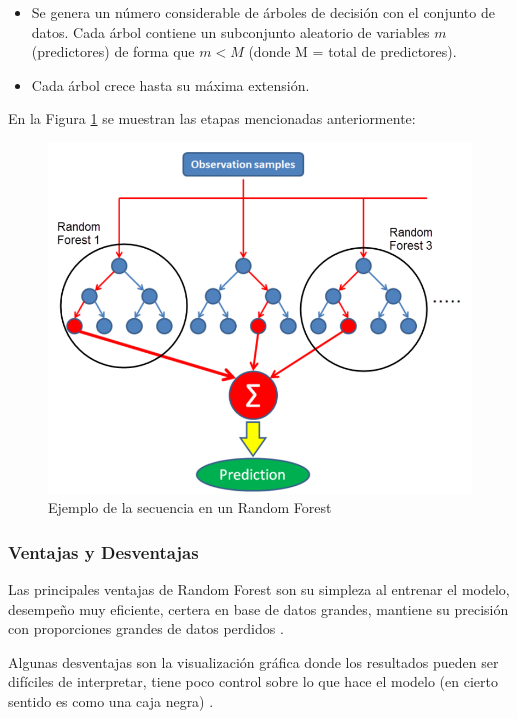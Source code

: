 \begin{itemize}
	\item[1-.] Se genera un número considerable de árboles de decisión con el conjunto de datos. Cada árbol contiene un subconjunto aleatorio de variables $m$ (predictores) de forma que $m < M$ (donde M = total de predictores).
	\item[2-.] Cada árbol crece hasta su máxima extensión.
\end{itemize}

\par En la Figura \ref{fig:Random Forest} se muestran las etapas mencionadas anteriormente:

\begin{center}
	\begin{figure}[H]
		\centering
		\includegraphics[scale=0.5]{img/Marco Teorico/random-forest-1.png} 
		\caption{Ejemplo de la secuencia en un Random Forest}
		\label{fig:Random Forest}
	\end{figure}
\end{center}


\doublespacing
\subsubsection{Ventajas y Desventajas}

Las principales ventajas de Random Forest son su simpleza al entrenar el modelo, desempeño muy eficiente, certera en base de datos grandes, mantiene su precisión con proporciones grandes de datos perdidos \cite{canovas2017modification}.\\
\par Algunas desventajas son la visualización gráfica donde los resultados pueden ser difíciles de interpretar, tiene poco control sobre lo que hace el modelo (en cierto sentido es como una caja negra) \cite{canovas2017modification}.\\

